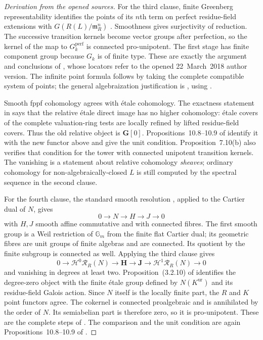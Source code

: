 \begin{proof}[Derivation from the opened sources]
For the third clause, finite Greenberg representability identifies
the points of its $n$th term on perfect residue-field extensions with
$G(R(L)/\mathfrak m_R^n)$
\cite[Proposition--Definition~7.10, (7.16)]{BBertapelleGonzalezAviles2022}.
Smoothness gives surjectivity of reduction. The successive transition
kernels become vector groups after perfection, so the kernel of the
map to $G_k^{\mathrm{perf}}$ is connected pro-unipotent. The first
stage has finite component group because $G_k$ is of finite type.
These are exactly the argument and conclusions of
\cite[Proposition~(3.4.2)(a), pp.~48--49]{BSuzuki2020},
whose locators refer to the opened 22~March~2018 author version.
The infinite point formula follows by taking the complete compatible
system of points; the general algebraization justification is
\cite[Proposition~18.2]{BBertapelleGonzalezAviles2022}, using
\cite[Theorem~4.1, Remarks~4.3 and~4.6]{ROOT_BhattAlgebraization2014}.

Smooth fppf cohomology agrees with étale cohomology. The exactness
statement in \cite[Proposition~(3.4.1)]{BSuzuki2020} says that the
relative étale direct image has no higher cohomology: étale covers of
the complete valuation-ring tests are locally refined by lifted
residue-field covers. Thus the old relative object is
$\mathbf G[0]$. Propositions~10.8--10.9 of
\cite{BSuzuki2021} identify it with the new functor above and give
the unit condition. Proposition~7.10(b) also verifies that condition
for the tower with connected unipotent transition kernels. The
vanishing is a statement about relative cohomology \emph{sheaves};
ordinary cohomology for non-algebraically-closed $L$ is still computed
by the spectral sequence in the second clause.

For the fourth clause, the standard smooth resolution
\cite[Proposition~2.2.1, pp.~25--27]{BBegueri1980}, applied to the
Cartier dual of $N$, gives
\[
 0\longrightarrow N\longrightarrow H\longrightarrow J\longrightarrow0
\]
with $H,J$ smooth affine commutative and with connected fibres.
The first smooth group is a Weil restriction of $\mathbb G_m$ from
the finite flat Cartier dual; its geometric fibres are unit groups of
finite algebras and are connected. Its quotient by the finite
subgroup is connected as well. Applying the third clause gives
\[
 0\to\mathcal H^0\mathcal R_R(N)\to\mathbf H\to\mathbf J
 \to\mathcal H^1\mathcal R_R(N)\to0
\]
and vanishing in degrees at least two.
Proposition~(3.2.10) of \cite{BSuzuki2020} identifies the degree-zero
object with the finite étale group defined by $N(K^{\mathrm{ur}})$
and its residue-field Galois action. Since $N$ itself is the locally
finite part, the $R$ and $K$ point functors agree.
The cokernel is connected proalgebraic and is annihilated by the
order of $N$. Its semiabelian part is therefore zero, so it is
pro-unipotent. These are the complete steps of
\cite[Proposition~(3.4.2)(b)]{BSuzuki2020}. The comparison and the
unit condition are again Propositions~10.8--10.9 of \cite{BSuzuki2021}.
\end{proof}

